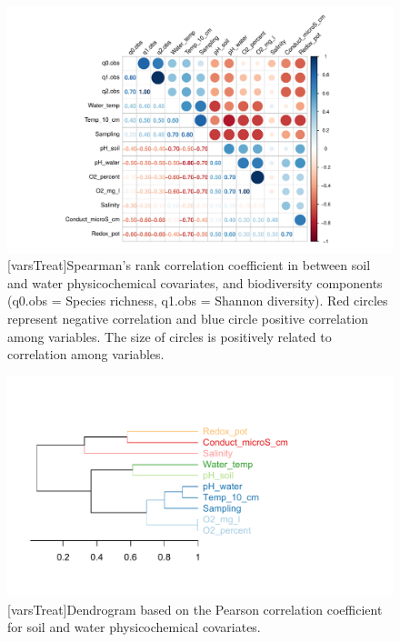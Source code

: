 \begin{figure}[htbp]
\captionsetup{justification=justified}
	\centering 
	\includegraphics[scale=0.4, center]{Figures/Chapter_1/Corr_plot_nooutliers.pdf}
	[varsTreat]{Spearman's rank correlation coefficient in between soil and water physicochemical covariates, and biodiversity components (q0.obs = Species richness, q1.obs = Shannon diversity). Red circles represent negative correlation and blue circle positive correlation among variables. The size of circles is positively related to correlation among variables.}  
 \label{Corr_plot}
\end{figure}


\begin{figure}[htbp]
\captionsetup{justification=justified}
	\centering 
	\includegraphics[scale=0.6, center]{Figures/Chapter_1/Cluster_variables_pearson_5_nooutliers2.pdf}
	[varsTreat]{Dendrogram based on the Pearson correlation coefficient for soil and water physicochemical covariates.}  
 \label{Dendro}
\end{figure}

